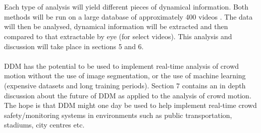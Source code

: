 \documentclass[11pt]{article}
\begin{document}
\\\\
Each type of analysis will yield different pieces of dynamical information. Both methods will be run on a large database of approximately 400 videos \cite{crowdMotionDB}. The data will then be analysed, dynamical information will be extracted and then compared to that extractable by eye (for select videos). This analysis and discussion will take place in sections 5 and 6.
\\\\
DDM has the potential to be used to implement real-time analysis of crowd motion without the use of image segmentation, or the use of machine learning (expensive datasets and long training periods). Section 7 contains an in depth discussion about the future of DDM as applied to the analysis of crowd motion. The hope is that DDM might one day be used to help implement real-time crowd safety/monitoring systems in environments such as public transportation, stadiums, city centres etc.

\clearpage
\end{document}

